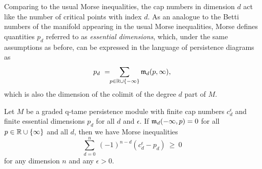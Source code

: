 Comparing to the usual Morse inequalities, the cap numbers in dimension $d$ act like the number of critical points with index $d$.
As an analogue to the Betti numbers of the manifold appearing in the usual Morse inequalities, Morse defines quantities $p_{d}$ referred to as \emph{essential dimensions}, which, under the same assumptions as before, can be expressed in the language of persistence diagrams as
\[
p_{d} \ = \!\! \sum_{p \in \mathbb{R} \cup \{-\infty\}} \mathfrak{m}_d(p,\infty),
\]
which is also the dimension of the colimit of the degree $d$ part of $M$.

\begin{thm} \label{t:inequalities}
	Let $M$ be a graded q-tame persistence module with finite cap numbers $c_{d}^{\epsilon}$ and finite essential dimensions $p_{d}$ for all $d$ and $\epsilon$.
	If $\mathfrak{m}_d(-\infty, p) = 0$ for all $p \in \mathbb{R} \cup \{\infty\}$ and all $d$, then we have Morse inequalities
	\begin{equation} \label{e:morse inequalities}
	\sum_{d=0}^n \ (-1)^{n-d} (c_{d}^{\epsilon} - p_{d}) \ \geq\ 0
	\end{equation}
	for any dimension $n$ and any $\epsilon > 0$.
\end{thm}

